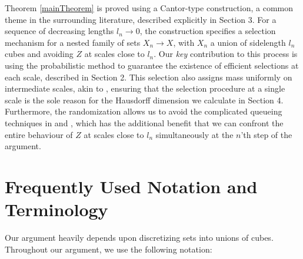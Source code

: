 \documentclass[dvipsnames,letterpaper,12pt]{article}
\theoremstyle{plain}
\begin{document}
Theorem \ref{mainTheorem} is proved using a Cantor-type construction, a common theme in the surrounding literature, described explicitly in Section 3. For a sequence of decreasing lengths $l_n \to 0$, the construction specifies a selection mechanism for a nested family of sets $X_n \to X$, with $X_n$ a union of sidelength $l_n$ cubes and avoiding $Z$ at scales close to $l_n$. Our {\it key} contribution to this process is using the probabilistic method to guarantee the existence of efficient selections at each scale, described in Section 2. This selection also assigns mass uniformly on intermediate scales, akin to \cite{MalabikaRob}, ensuring that the selection procedure at a single scale is the sole reason for the Hausdorff dimension we calculate in Section 4. Furthermore, the randomization allows us to avoid the complicated queueing techniques in \cite{KeletiDimOneSet} and \cite{MalabikaRob}, which has the additional benefit that we can confront the entire behaviour of $Z$ at scales close to $l_n$ simultaneously at the $n$'th step of the argument.










\section{Frequently Used Notation and Terminology}\label{notationSection}

Our argument heavily depends upon discretizing sets into unions of cubes. Throughout our argument, we use the following notation:
\end{document}
